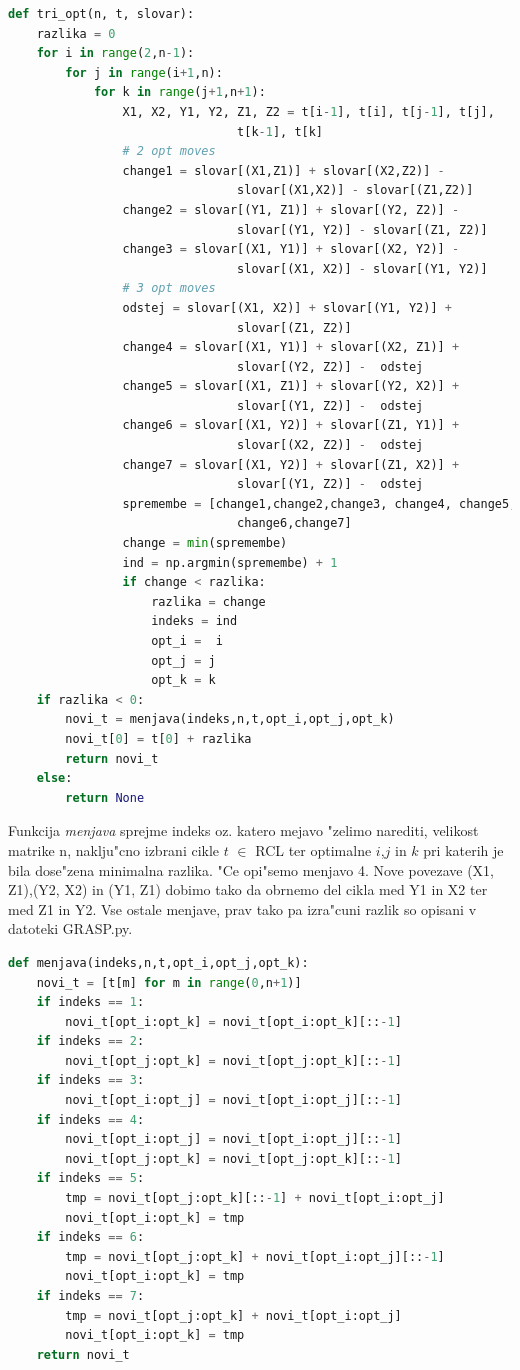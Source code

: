 \documentclass[12pt,a4paper]{amsart}
\theoremstyle{definition} %
\theoremstyle{plain} %
\begin{document}
\begin{lstlisting}[language=Python]
def tri_opt(n, t, slovar):
    razlika = 0    
    for i in range(2,n-1):
        for j in range(i+1,n):
            for k in range(j+1,n+1):
                X1, X2, Y1, Y2, Z1, Z2 = t[i-1], t[i], t[j-1], t[j], 
								t[k-1], t[k]
                # 2 opt moves
                change1 = slovar[(X1,Z1)] + slovar[(X2,Z2)] -  
								slovar[(X1,X2)] - slovar[(Z1,Z2)]
                change2 = slovar[(Y1, Z1)] + slovar[(Y2, Z2)] -  
								slovar[(Y1, Y2)] - slovar[(Z1, Z2)] 
                change3 = slovar[(X1, Y1)] + slovar[(X2, Y2)] -  
								slovar[(X1, X2)] - slovar[(Y1, Y2)]
                # 3 opt moves
                odstej = slovar[(X1, X2)] + slovar[(Y1, Y2)] + 
								slovar[(Z1, Z2)]
                change4 = slovar[(X1, Y1)] + slovar[(X2, Z1)] + 
								slovar[(Y2, Z2)] -  odstej
                change5 = slovar[(X1, Z1)] + slovar[(Y2, X2)] + 
								slovar[(Y1, Z2)] -  odstej
                change6 = slovar[(X1, Y2)] + slovar[(Z1, Y1)] + 
								slovar[(X2, Z2)] -  odstej
                change7 = slovar[(X1, Y2)] + slovar[(Z1, X2)] + 
								slovar[(Y1, Z2)] -  odstej
                spremembe = [change1,change2,change3, change4, change5,
								change6,change7]
                change = min(spremembe)
                ind = np.argmin(spremembe) + 1 
                if change < razlika:
                    razlika = change
                    indeks = ind
                    opt_i =  i 
                    opt_j = j
                    opt_k = k
    if razlika < 0: 
        novi_t = menjava(indeks,n,t,opt_i,opt_j,opt_k) 
        novi_t[0] = t[0] + razlika 
        return novi_t
    else:
        return None
\end{lstlisting}

Funkcija \textit{menjava} sprejme indeks oz. katero mejavo "zelimo narediti, velikost matrike n, naklju"cno izbrani cikle $t$ $\in$ RCL ter optimalne $i$,$j$ in $k$ pri katerih je bila dose"zena minimalna razlika. 
"Ce opi"semo menjavo 4. Nove povezave (X1, Z1),(Y2, X2) in (Y1, Z1) dobimo tako da obrnemo del cikla med Y1 in X2 ter med Z1 in Y2.
Vse ostale menjave, prav tako pa izra"cuni razlik so opisani v datoteki GRASP.py.  


\begin{lstlisting}[language=Python]
def menjava(indeks,n,t,opt_i,opt_j,opt_k):   
    novi_t = [t[m] for m in range(0,n+1)]
    if indeks == 1:
        novi_t[opt_i:opt_k] = novi_t[opt_i:opt_k][::-1]
    if indeks == 2:
        novi_t[opt_j:opt_k] = novi_t[opt_j:opt_k][::-1]
    if indeks == 3:
        novi_t[opt_i:opt_j] = novi_t[opt_i:opt_j][::-1]      
    if indeks == 4:
        novi_t[opt_i:opt_j] = novi_t[opt_i:opt_j][::-1]
        novi_t[opt_j:opt_k] = novi_t[opt_j:opt_k][::-1]      
    if indeks == 5:
        tmp = novi_t[opt_j:opt_k][::-1] + novi_t[opt_i:opt_j]
        novi_t[opt_i:opt_k] = tmp        
    if indeks == 6:
        tmp = novi_t[opt_j:opt_k] + novi_t[opt_i:opt_j][::-1]
        novi_t[opt_i:opt_k] = tmp      
    if indeks == 7:
        tmp = novi_t[opt_j:opt_k] + novi_t[opt_i:opt_j]
        novi_t[opt_i:opt_k] = tmp
    return novi_t
\end{lstlisting}
\end{document}
